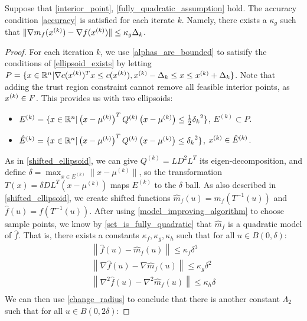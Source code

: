 \begin{lemma}
Suppose that \cref{interior_point}, \cref{fully_quadratic_assumption} hold. The accuracy condition \cref{accuracy} is satisfied for each iterate $k$.
Namely, there exists a $\kappa_{g}$ such that $\|\nabla m_f({x^{(k)}}) - \nabla f({x^{(k)}})\| \le \kappa_g \Delta_k$.
\end{lemma}

\begin{proof}
For each iteration $k$, we use \cref{alphas_are_bounded} to satisify the conditions of \cref{ellipsoid_exists} by letting 
$P = \{x \in \mathbb R^n |  \nabla c({x^{(k)}})^T x \le c({x^{(k)}}), {x^{(k)}} - \Delta_k \le x \le {x^{(k)}} + \Delta_k \}$.
Note that adding the trust region constraint cannot remove all feasible interior points, as ${x^{(k)}} \in {F}$.
This provides us with two ellipsoids:
\begin{itemize}
\item $E^{(k)} = \{x \in \mathbb R^n | \left(x - \mu^{(k)}\right)^T Q^{(k)} \left(x - \mu^{(k)}\right) \le \frac 1 2 {\delta_k}^2 \}$, $E^{(k)} \subset P$.
\item $\hat E^{(k)} = \{x \in \mathbb R^n | \left(x - \mu^{(k)}\right)^T Q^{(k)} \left(x - \mu^{(k)}\right) \le {\delta_k}^2 \}$, ${x^{(k)}} \in \hat E^{(k)}$.
\end{itemize}
As in \cref{shifted_ellipsoid}, we can give $Q^{(k)} = LD^2L^T$ its eigen-decomposition, and define $\delta = \max_{x \in E^{(k)}} \|x - \mu^{(k)}\|$, 
so the transformation $T(x) = \delta D L^T(x - \mu^{(k)})$ maps $E^{(k)}$ to the $\delta$ ball.
As also described in \cref{shifted_ellipsoid}, we  create shifted functions
$\hat {m}_f(u) = m_f(T^{-1}(u))$ and
$\hat f (u) = f(T^{-1}(u))$.
After using \cref{model_improving_algorithm} to choose sample points, we know by \cref{set_is_fully_quadratic} that ${\hat m }_f$ is a quadratic model of $\hat f$.
That is, there exists a constants $\kappa_f, \kappa_g, \kappa_h$ such that for all $u \in B(0, \delta)$:
\begin{align*}
\left\| \hat {f}\left(u\right) -  \hat{m}_f\left(u\right) \right\|\le \kappa_f \delta^3 \\
\left\|\nabla \hat {f}\left(u\right) - \nabla \hat{m}_f\left(u\right) \right\|\le \kappa_g \delta^2 \\
\left\|\nabla^2 \hat {f}\left(u\right) - \nabla^2 \hat{m}_f\left(u\right) \right\|\le \kappa_h \delta \\
\end{align*}
We can then use \cref{change_radius} to conclude that there is another constant $\Lambda_2$ such that for all $u \in B(0, 2\delta)$:

\end{proof}
